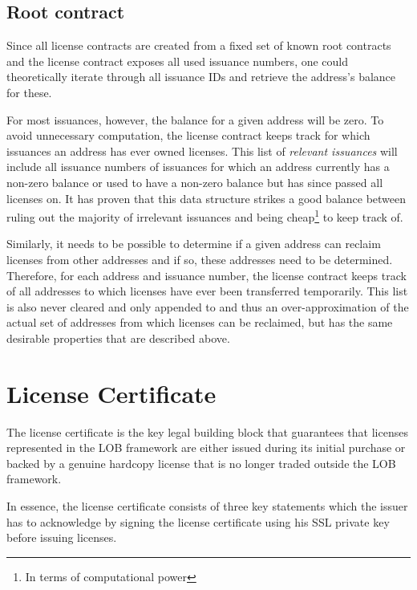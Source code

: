 \documentclass[a4paper]{article}
\begin{document}
\subsection{Root contract}
\label{ch:rootContract}

Since all license contracts are created from a fixed set of known root contracts and the license contract exposes all used issuance numbers, one could theoretically iterate through all issuance IDs and retrieve the address's balance for these.

For most issuances, however, the balance for a given address will be zero. To avoid unnecessary computation, the license contract keeps track for which issuances an address has ever owned licenses. This list of \emph{relevant issuances} will include all issuance numbers of issuances for which an address currently has a non-zero balance or used to have a non-zero balance but has since passed all licenses on. It has proven that this data structure strikes a good balance between ruling out the majority of irrelevant issuances and being cheap\footnote{In terms of computational power} to keep track of.

Similarly, it needs to be possible to determine if a given address can reclaim licenses from other addresses and if so, these addresses need to be determined. Therefore, for each address and issuance number, the license contract keeps track of all addresses to which licenses have ever been transferred temporarily. This list is also never cleared and only appended to and thus an over-approximation of the actual set of addresses from which licenses can be reclaimed, but has the same desirable properties that are described above.





\section{License Certificate}
\label{ch:licenseCertificate}

The license certificate is the key legal building block that guarantees that licenses represented in the LOB framework are either issued during its initial purchase or backed by a genuine hardcopy license that is no longer traded outside the LOB framework.

In essence, the license certificate consists of three key statements which the issuer has to acknowledge by signing the license certificate using his SSL private key before issuing licenses.
\end{document}
